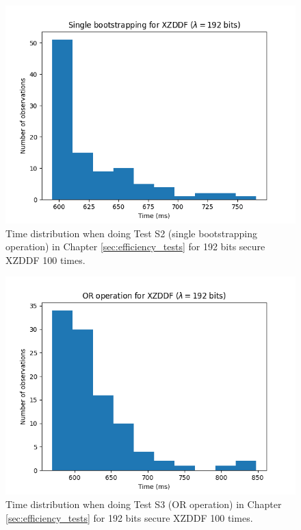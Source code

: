 \begin{figure}[ht]
    \centering
    \includegraphics[width=0.8\linewidth]{data/figures/XZDDF_STD192_Single_bootstrapping.png}
    \caption{Time distribution when doing Test S2 (single bootstrapping operation) in Chapter \ref{sec:efficiency_tests} for 192 bits secure XZDDF 100 times.}
    \label{fig:distr_xzddf192_bs}
\end{figure}

\begin{figure}[ht]
    \centering
    \includegraphics[width=0.8\linewidth]{data/figures/XZDDF_STD192_OR_operation.png}
    \caption{Time distribution when doing Test S3 (OR operation) in Chapter \ref{sec:efficiency_tests} for 192 bits secure XZDDF 100 times.}
    \label{fig:distr_xzddf192_or}
\end{figure}

